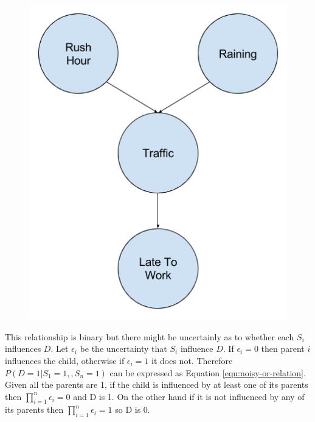 \begin{minipage}[t]{0.35\textwidth}
\vspace{0px}
\begin{figure}[H]
	\centering
	\begin{minipage}[b]{1.0\textwidth}
		\includegraphics[width=\textwidth]{bayesian-network-example.png}
		\caption{}
		\label{fig:bayesian-network-example}
	\end{minipage}
	\hfill
\end{figure}
\end{minipage}

This relationship is binary but there might be uncertainly as to whether each $S_i$ influences $D$. Let $\epsilon_i$ be the uncertainty that $S_i$ influence $D$. If $\epsilon_i = 0$ then parent $i$ influences the child, otherwise if $\epsilon_i = 1$ it does not. Therefore $P(D = 1| S_1 = 1, , S_n = 1)$ can be expressed as Equation \ref{equ:noisy-or-relation}. Given all the parents are 1, if the child is influenced by at least one of its parents then $\prod^n_{i=1} \epsilon_i = 0$ and D is 1. On the other hand if it is not influenced by any of its parents then $\prod^n_{i=1} \epsilon_i = 1$ so D is 0.

